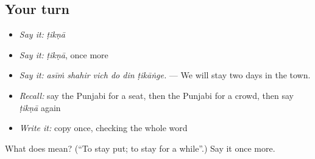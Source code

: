 \subsection*{Your turn}
\begin{itemize}
\raggedright
  \item \emph{Say it:} \emph{ṭikṇā}
  \item \emph{Say it:} \emph{ṭikṇā}, once more
  \item \emph{Say it:} \emph{asīṁ shahir vich do din ṭikāṅge.} — We will stay two days in the town.
  \item \emph{Recall:} say the Punjabi for a seat, then the Punjabi for a crowd, then say \emph{ṭikṇā} again
  \item \emph{Write it:} copy \textbf{} once, checking the whole word
\end{itemize}

\begin{tcolorbox}[breakable,colback=teal!4,colframe=teal!35!black,title={Before you move on}]
What does  mean? (\textquotedblleft{}To stay put; to stay for a while\textquotedblright{}.) Say it once more.
\end{tcolorbox}
